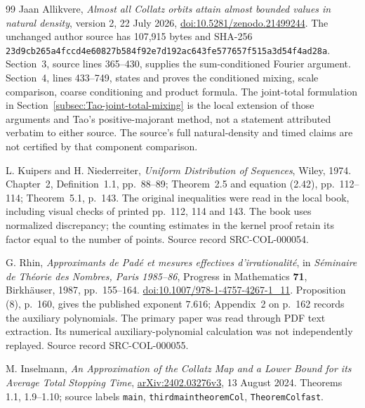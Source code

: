 \begin{thebibliography}{99}
Jaan Allikvere,
\emph{Almost all Collatz orbits attain almost bounded values in natural density},
version 2, 22 July 2026,
\href{https://doi.org/10.5281/zenodo.21499244}{doi:10.5281/zenodo.21499244}.
The unchanged author source  has 107,915 bytes and SHA-256
\nolinkurl{23d9cb265a4fccd4e60827b584f92e7d192ac643fe577657f515a3d54f4ad28a}.
Section~3, source lines 365--430, supplies the sum-conditioned Fourier
argument. Section~4, lines 433--749, states and proves the conditioned
mixing, scale comparison, coarse conditioning and product formula.
The joint-total formulation in
Section~\ref{subsec:Tao-joint-total-mixing} is the local extension of those
arguments and Tao's positive-majorant method, not a statement attributed
verbatim to either source. The source's full natural-density and timed
claims are not certified by that component comparison.

L. Kuipers and H. Niederreiter, \emph{Uniform Distribution of Sequences},
Wiley, 1974. Chapter~2, Definition~1.1, pp.~88--89;
Theorem~2.5 and equation (2.42), pp.~112--114; Theorem~5.1, p.~143.
The original inequalities were read in the local book, including visual
checks of printed pp.~112, 114 and 143. The book uses normalized
discrepancy; the counting estimates in the kernel proof retain its
factor equal to the number of points. Source record SRC-COL-000054.

G. Rhin, \emph{Approximants de Pad\'e et mesures effectives
d'irrationalit\'e}, in \emph{S\'eminaire de Th\'eorie des Nombres,
Paris 1985--86}, Progress in Mathematics \textbf{71}, Birkh\"auser,
1987, pp.~155--164.
\href{https://doi.org/10.1007/978-1-4757-4267-1_11}{doi:10.1007/978-1-4757-4267-1\_11}.
Proposition (8), p.~160, gives the published exponent $7.616$;
Appendix~2 on p.~162 records the auxiliary polynomials.
The primary paper was read through PDF text extraction. Its numerical
auxiliary-polynomial calculation was not independently replayed.
Source record SRC-COL-000055.

 M. Inselmann,
\emph{An Approximation of the Collatz Map and a Lower Bound for its Average Total Stopping Time},
\href{https://arxiv.org/abs/2402.03276v3}{arXiv:2402.03276v3}, 13 August 2024.
Theorems 1.1, 1.9--1.10; source labels \texttt{main},
\texttt{thirdmaintheoremCol}, \texttt{TheoremColfast}.
\end{thebibliography}
\endgroup

